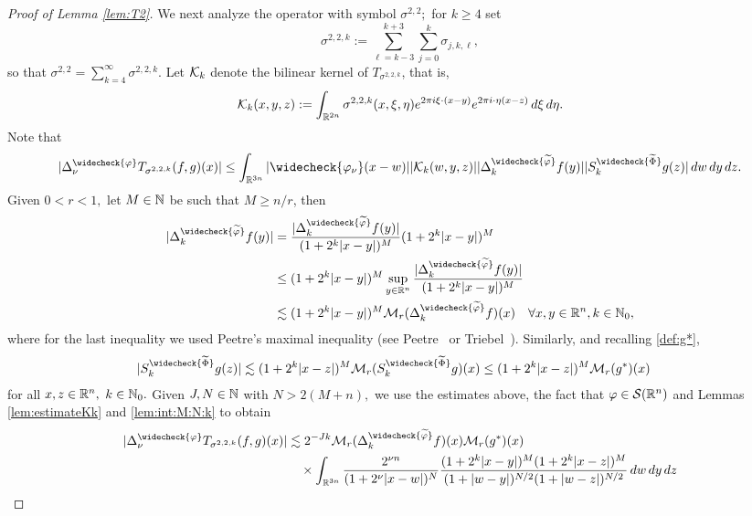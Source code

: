 \begin{proof}[Proof of Lemma \ref{lem:T2}]
We next analyze the operator with  symbol $\sigma^{2,2};$ for $k \geq 4$ set 
\begin{equation*}
\sigma^{2,2,k} := \sum\limits_{\ell =k-3}^{k+3} \sum\limits_{j=0}^k \sigma_{j,k,\ell},
\end{equation*}
so that $\sigma^{2,2} = \sum\limits_{k=4}^\infty \sigma^{2,2,k}.$ 
 Let $\mathcal{K}_k$ denote the bilinear kernel of  $T_{\sigma^{2,2,k}}$, that is,
$$
\mathcal{K}_k(x,y,z):= \int_{\mathbb{R}^{2n}} \sigma^{2,2,k}(x, \xi, \eta) e^{2\pi i \xi \cdot( x- y)} e^{2\pi i \cdot \eta (x-z)} \, d\xi \, d\eta.
$$
Note that
\begin{align*}
| \Delta^{\widecheck{\f}}_\nu T_{\sigma^{2,2,k}}(f,g)(x)| \leq \int_{\re^{3n}} |\widecheck{\f_\nu}(x- w)| |\K_k(w, y, z)| |\Delta^{\widecheck{\widetilde{\f}}}_k f(y)| |S^{\widecheck{\widetilde{\Phi}}}_k g(z)| \, dw \dy \dz.
\end{align*}
Given $0<r <1,$  let $M \in \mathbb{N}$ be such that $M \geq n/r$, then
\begin{align*}
|\Delta^{\widecheck{\widetilde{\f}}}_k f(y)|&  = \frac{|\Delta^{\widecheck{\widetilde{\f}}}_k f(y)|}{(1 + 2^k |x-y|)^M} (1 + 2^k |x-y|)^M\\
& \leq  (1 + 2^k |x-y|)^M \sup_{y\in\rn} \frac{|\Delta^{\widecheck{\widetilde{\f}}}_k f(y)|}{(1 + 2^k |x-y|)^M} \\
& \lesssim (1 + 2^k |x-y|)^M \mathcal{M}_r(\Delta^{\widecheck{\widetilde{\f}}}_k f)(x)\quad\forall x,y\in\rn,k\in\na_0,
\end{align*}
where for the last inequality we used Peetre's maximal inequality (see Peetre~\cite{MR0380394} or Triebel~\cite[p.16, Theorem 1.3.1]{MR3024598}). Similarly, and recalling \eqref{def:g*},
\begin{align*}
|S^{\widecheck{\widetilde{\Phi}}}_k g(z)| & \lesssim (1 + 2^k |x-z|)^M \mathcal{M}_r(S^{\widecheck{\widetilde{\Phi}}}_k g)(x)  \leq (1 + 2^k |x-z|)^M \mathcal{M}_r(g^*)(x)
\end{align*}
for all $ x,z\in{{\mathbb R}^n},$ $k\in\mathbb{N}_0.$
Given $J, N \in \mathbb{N}$ with $N>2(M+n),$  we use the estimates above, the fact that $\varphi\in{\mathcal{S}}({{\mathbb R}^n})$ and Lemmas \ref{lem:estimateKk} and  \ref{lem:int:M:N:k} to obtain 
\begin{align*}
 |\Delta^{\widecheck{\f}}_\nu T_{\sigma^{2,2,k}}(f,g)(x)| &\lesssim 2^{-Jk} \mathcal{M}_r(\Delta^{\widecheck{\widetilde{\f}}}_k f)(x) \mathcal{M}_r(g^*)(x)\\
 &\quad\times \int_{\re^{3n}} \frac{2^{\nu n}}{(1+ 2^\nu |x- w|)^N} \frac{(1 + 2^k |x-y|)^M (1 + 2^k |x-z|)^M}{(1+ |w-y|)^{N/2} (1+ |w-z|)^{N/2}} \, dw \dy \dz\\

\end{align*}
\end{proof}
